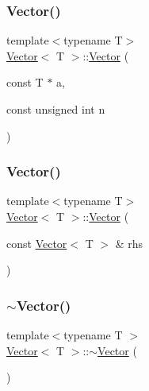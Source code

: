 \subsubsection{\texorpdfstring{Vector()}{Vector()}\hspace{0.1cm}{\footnotesize\ttfamily [4/5]}}
{\footnotesize\ttfamily template$<$typename T$>$ \\
\mbox{\hyperlink{classVector}{Vector}}$<$ T $>$\+::\mbox{\hyperlink{classVector}{Vector}} (\begin{DoxyParamCaption}\item[{const T $\ast$}]{a,  }\item[{const unsigned int}]{n }\end{DoxyParamCaption})}

\mbox{\label{classVector_ac71d98c4ac152523a76bbadcd3a83a5a}} 
\subsubsection{\texorpdfstring{Vector()}{Vector()}\hspace{0.1cm}{\footnotesize\ttfamily [5/5]}}
{\footnotesize\ttfamily template$<$typename T$>$ \\
\mbox{\hyperlink{classVector}{Vector}}$<$ T $>$\+::\mbox{\hyperlink{classVector}{Vector}} (\begin{DoxyParamCaption}\item[{const \mbox{\hyperlink{classVector}{Vector}}$<$ T $>$ \&}]{rhs }\end{DoxyParamCaption})}

\mbox{\label{classVector_afd524fac19e6d3d69db5198ffe2952b0}} 
\subsubsection{\texorpdfstring{$\sim$\+Vector()}{~Vector()}}
{\footnotesize\ttfamily template$<$typename T $>$ \\
\mbox{\hyperlink{classVector}{Vector}}$<$ T $>$\+::$\sim$\mbox{\hyperlink{classVector}{Vector}} (\begin{DoxyParamCaption}{ }\end{DoxyParamCaption})}



